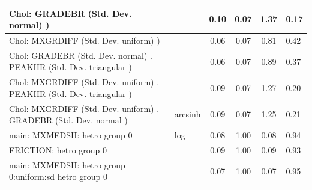 \begin{table}
\begin{center}
\begin{tabular}{|l|l|c|c|c|l|}
			 Chol: GRADEBR (Std. Dev. normal) ) &  & 0.10 & 0.07 & 1.37 & 0.17 \\
			\hline
			 Chol: MXGRDIFF (Std. Dev. uniform) ) &  & 0.06 & 0.07 & 0.81 & 0.42 \\
			\hline
			 Chol: GRADEBR (Std. Dev. normal) . PEAKHR (Std. Dev.   triangular ) &  & 0.06 & 0.07 & 0.89 & 0.37 \\
			\hline
			 Chol: MXGRDIFF (Std. Dev. uniform) . PEAKHR (Std. Dev.   triangular ) &  & 0.09 & 0.07 & 1.27 & 0.20 \\
			\hline
			 Chol: MXGRDIFF (Std. Dev. uniform) . GRADEBR (Std. Dev.   normal ) & arcsinh & 0.09 & 0.07 & 1.25 & 0.21 \\
			\hline
			main: MXMEDSH: hetro group 0 & log & 0.08 & 1.00 & 0.08 & 0.94 \\
			\hline
			FRICTION: hetro group 0 &  & 0.09 & 1.00 & 0.09 & 0.93 \\
			\hline
			main: MXMEDSH: hetro group 0:uniform:sd  hetro group 0 &  & 0.07 & 1.00 & 0.07 & 0.95 \\
			\hline
		\end{tabular}
	\end{center}
\end{table}